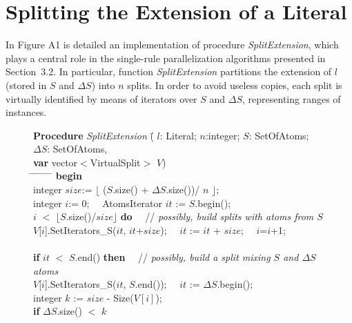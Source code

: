 \documentclass[preprint]{tlp}
\newcommand{\DNF}{\ensuremath{\Delta S}\xspace}
\begin{document}
\clearpage{}\appendix
\section{Splitting the Extension of a Literal}\label{app:split}
In Figure A1 is detailed an implementation of procedure {\em SplitExtension}, 
which plays a central role in the single-rule parallelization algorithms presented in Section~3.2.
In particular, function {\em SplitExtension} partitions the
extension of $l$ (stored in $S$ and $\DNF$) into $n$  splits.
In order to avoid useless copies, each split is virtually identified by means of
iterators over $S$ and $\DNF$, representing ranges of instances.

\begin{figure}[h!]
\begin{tabbing}\footnotesize
{\bf Procedure} {\em SplitExtension \/}(\= $l$: Literal; $n$:integer; $S$: SetOfAtoms; $\DNF$: SetOfAtoms, \\
\hspace*{1.2cm} {\bf var} vector$<$VirtualSplit$>$ $V$)\\
\hspace*{0.2cm} \= \kill
\hspace*{0.4cm} \= \hspace*{0.4cm} \= \hspace*{0.4cm} \=
\hspace*{0.4cm} \= \hspace*{0.4cm} \= \hspace*{3cm} \=\kill
{\bf begin} \\
\> integer $size$:=  $\lfloor$ ($S$.size() + \DNF.size())/ $n$ $\rfloor$; \\
\> integer $i$:= 0; \ \  AtomsIterator $it$ := $S$.begin(); \\
 $i$ $<$ $\lfloor$$S$.size()/$size$$\rfloor$ {\bf do} \ \ // {\em possibly, build splits with atoms from $S$}\\
\>\> $V$[$i$].SetIterators\_S($it$, $it$+$size$); \ \ $it$ := $it$ + $size$; \ \ $i$=$i$+1;\\
\\
\> {\bf if} $it$ $<$ $S$.end() {\bf then} \ \ // {\em possibly, build a split mixing $S$ and \DNF atoms} \\
\>\> $V$[$i$].SetIterators\_S($it$, $S$.end()); \ \ $it$ := \DNF.begin(); \\
\>\> integer $k$ := $size$ - Size($V[i]$); \\
\>\> {\bf if} \DNF.size() $<$ $k$ \\

\end{tabbing}
\end{figure}
\end{document}
